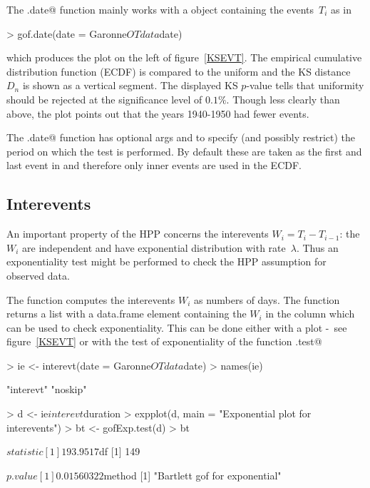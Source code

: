 \documentclass[a4paper]{report}
\begin{document}
The \verb@gof.date@ function mainly works with a \verb@POSIX@ object
containing the events~$T_i$ as in

\begin{Schunk}
\begin{Sinput}
> gof.date(date = Garonne$OTdata$date)
\end{Sinput}
\end{Schunk}

\noindent
which produces the plot on the left of figure~\ref{KSEVT}. The
empirical cumulative distribution function (ECDF) is compared to the
uniform and the KS distance $D_n$ is shown as a vertical segment.
The displayed KS $p$-value tells that uniformity should be rejected at
the significance level of $0.1\%$. Though less clearly than above, the
plot points out that the years 1940-1950 had fewer events.

The \verb@gof.date@ function has optional args \verb@start@ and
\verb@end@ to specify (and possibly restrict) the period on which the 
test is performed.
By default these are taken as the first and last event in \verb@date@
and therefore only inner events are used in the ECDF.

\subsection{Interevents}
% 
An important property of the HPP concerns the interevents 
$W_i = T_i-T_{i-1}$: the $W_i$ are independent and have exponential 
distribution 
%
with rate~$\lambda$. Thus an exponentiality test might be performed
to check the HPP assumption for observed data.

The \verb@interevt@ function computes the interevents $W_i$ as numbers of days. The
function returns a list with a \verb@interevt@ data.frame element containing
the $W_i$ in the \verb@duration@ column which can be used to check exponentiality.
This can be done either with a plot -~see figure~\ref{KSEVT} or 
with the test of exponentiality  of the function \verb@gofExp.test@

\begin{Schunk}
\begin{Sinput}
> ie <- interevt(date = Garonne$OTdata$date)
> names(ie)
\end{Sinput}
\begin{Soutput}
[1] "interevt" "noskip"  
\end{Soutput}
\begin{Sinput}
> d <- ie$interevt$duration
> expplot(d, main = "Exponential plot for interevents")
> bt <- gofExp.test(d) 
> bt
\end{Sinput}
\begin{Soutput}
$statistic
[1] 193.9517

$df
[1] 149

$p.value
[1] 0.01560322

$method
[1] "Bartlett gof for exponential"
\end{Soutput}
\end{Schunk}
\end{document}
